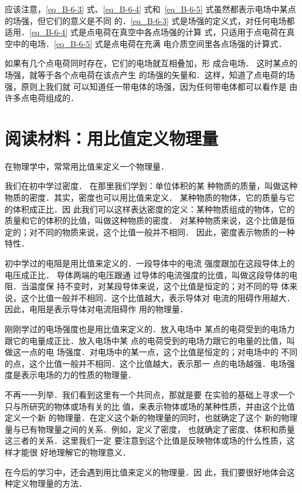 应该注意，\eqref{eq_B-6-3} 式、\eqref{eq_B-6-4} 式和~\eqref{eq_B-6-5} 式虽然都表示电场中某点
的场强，但它们的意义是不同
的．\eqref{eq_B-6-3} 式是场强的定义式，对任何电场都适用．\eqref{eq_B-6-4} 式是点电荷在真空中各点场强的计算
式，只适用于点电荷在真空中的电场．\eqref{eq_B-6-5} 式是点电荷在充满
电介质空间里各点场强的计算式．

如果有几个点电荷同时存在，它们的电场就互相叠加，形
成合电场．
这时某点的场强，就等于各个点电荷在该点产生
的场强的矢量和．这样，知道了点电荷的场强，原则上我们就
可以知道任一带电体的场强，因为任何带电体都可以看作是
由许多点电荷组成的．

\section*{阅读材料：用比值定义物理量}
在物理学中，常常用比值来定义一个物理量．

我们在初中学过密度．
在那里我们学到：单位体积的某
种物质的质量，叫做这种物质的密度．其实，密度也可以用比值来定义．
某种物质的物体，它的质量与它的体积成正比．因
此我们可以这样表达密度的定义：某种物质组成的物体，它的
质量和它的体积的比值，叫做这种物质的密度．
对某种物质来说，这个比值是恒定的；对不同的物质来说，这个比值一般并不相同．
因此，密度表示物质的一种特性．

初中学过的电阻是用比值来定义的．一段导体中的电流
强度跟加在这段导体上的电压成正比．
导体两端的电压跟通
过导体的电流强度的比值，叫做这段导体的电阻．当温度保
持不变时，对某段导体来说，这个比值是恒定的；对不同的导
体来说，这个比值一般并不相同．这个比值越大，表示导体对
电流的阻碍作用越大．因此，电阻是表示导体对电流阻碍作
用的物理量．

刚刚学过的电场强度也是用比值来定义的．放入电场中
某点的电荷受到的电场力跟它的电量成正比．放入电场中某
点的电荷受到的电场力跟它的电量的比值，叫做这一点的电
场强度．对电场中的某一点，这个比值是恒定的；对电场中的
不同的点，这个比值一般并不相同．这个比值越大，表示那一
点的电场越强．电场强度是表示电场的力的性质的物理量．

不再一一列举．我们看到这里有一个共同点，那就是要
在实验的基础上寻求一个只与所研究的物体或场有关的比
值，来表示物体或场的某种性质，并由这个比值定义一个新
的物理量．在定义这个新的物理量的同时，也就确定了这个
新的物理量与已有物理量之间的关系．例如，定义了密度，
也就确定了密度、体积和质量这三者的关系．这里我们一定
要注意到这个比值是反映物体或场的什么性质，这样才能很
好地理解它的物理意义．

在今后的学习中，还会遇到用比值来定义的物理量．因
此，我们要很好地体会这种定义物理量的方法．

